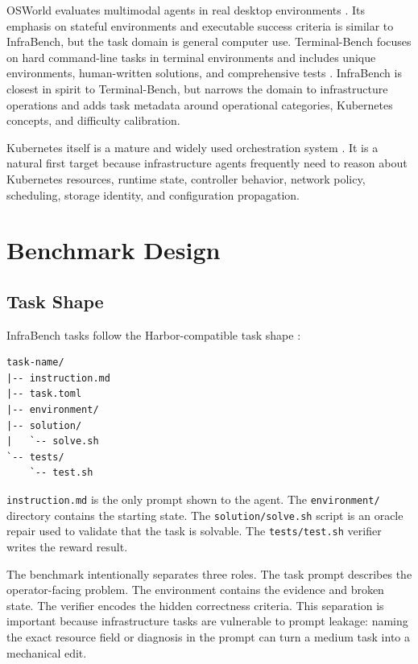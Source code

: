 \documentclass[11pt]{article}
\begin{document}
OSWorld evaluates multimodal agents in real desktop environments
\cite{xie2024osworld}. Its emphasis on stateful environments and executable
success criteria is similar to InfraBench, but the task domain is general
computer use. Terminal-Bench focuses on hard command-line tasks in terminal
environments and includes unique environments, human-written solutions, and
comprehensive tests \cite{merrill2026terminalbench}. InfraBench is closest in
spirit to Terminal-Bench, but narrows the domain to infrastructure operations
and adds task metadata around operational categories, Kubernetes concepts, and
difficulty calibration.

Kubernetes itself is a mature and widely used orchestration system
\cite{kubernetes2026}. It is a natural first target because infrastructure
agents frequently need to reason about Kubernetes resources, runtime state,
controller behavior, network policy, scheduling, storage identity, and
configuration propagation.

\section{Benchmark Design}

\subsection{Task Shape}

InfraBench tasks follow the Harbor-compatible task shape
\cite{harbor2026,infrabench2026}:

\begin{verbatim}
task-name/
|-- instruction.md
|-- task.toml
|-- environment/
|-- solution/
|   `-- solve.sh
`-- tests/
    `-- test.sh
\end{verbatim}

\texttt{instruction.md} is the only prompt shown to the agent. The
\texttt{environment/} directory contains the starting state. The
\texttt{solution/solve.sh} script is an oracle repair used to validate that the
task is solvable. The \texttt{tests/test.sh} verifier writes the reward result.

The benchmark intentionally separates three roles. The task prompt describes
the operator-facing problem. The environment contains the evidence and broken
state. The verifier encodes the hidden correctness criteria. This separation is
important because infrastructure tasks are vulnerable to prompt leakage: naming
the exact resource field or diagnosis in the prompt can turn a medium task into
a mechanical edit.
\end{document}
